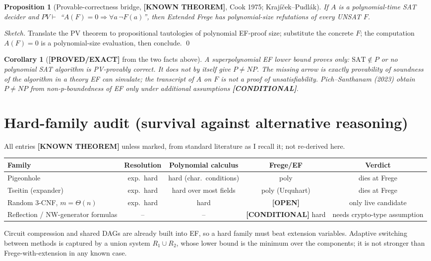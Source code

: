 \documentclass[11pt]{article}
\newtheorem{proposition}[theorem]{Proposition}
\newtheorem{corollary}[theorem]{Corollary}
\newcommand{\status}[1]{\textbf{[#1]}}
\newcommand{\SAT}{\mathrm{SAT}}
\begin{document}
\begin{proposition}[Provable-correctness bridge, \status{KNOWN THEOREM}, Cook 1975; Krajíček--Pudlák]
If $A$ is a polynomial-time SAT decider and $PV\vdash$ ``$A(F)=0\Rightarrow\forall a\,\neg F(a)$'', then Extended Frege has polynomial-size refutations of every UNSAT $F$.
\end{proposition}
\emph{Sketch.} Translate the PV theorem to propositional tautologies of polynomial EF-proof size; substitute the concrete $F$; the computation $A(F)=0$ is a polynomial-size evaluation, then conclude. \qed

\begin{corollary}[\status{PROVED/EXACT} from the two facts above]
A superpolynomial EF lower bound proves only: $\SAT\notin P$ \emph{or} no polynomial SAT algorithm is PV-provably correct. It does not by itself give $P\ne NP$. The missing arrow is exactly provability of soundness of the algorithm in a theory EF can simulate; the transcript of $A$ on $F$ is not a proof of unsatisfiability. Pich--Santhanam (2023) obtain $P\ne NP$ from non-p-boundedness of EF only under additional assumptions \status{CONDITIONAL}.
\end{corollary}

\section{Hard-family audit (survival against alternative reasoning)}
All entries \status{KNOWN THEOREM} unless marked, from standard literature as I recall it; not re-derived here.
\begin{center}\begin{tabular}{lcccc}
Family & Resolution & Polynomial calculus & Frege/EF & Verdict\\\hline
Pigeonhole & exp.\ hard & hard (char.\ conditions) & poly & dies at Frege\\
Tseitin (expander) & exp.\ hard & hard over most fields & poly (Urquhart) & dies at Frege\\
Random 3-CNF, $m=\Theta(n)$ & exp.\ hard & hard & \status{OPEN} & only live candidate\\
Reflection / NW-generator formulas & -- & -- & \status{CONDITIONAL} hard & needs crypto-type assumption
\end{tabular}\end{center}
Circuit compression and shared DAGs are already built into EF, so a hard family must beat extension variables. Adaptive switching between methods is captured by a union system $R_1\cup R_2$, whose lower bound is the minimum over the components; it is not stronger than Frege-with-extension in any known case.
\end{document}

